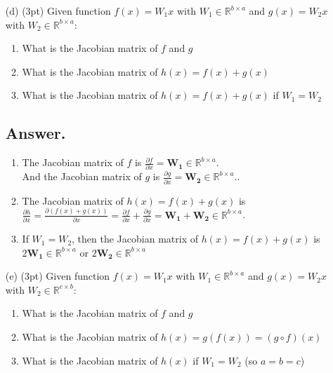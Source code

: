 \documentclass{article}
\begin{document}
\begin{itemize}
    \item[(d)] (3pt) Given function $f(x) = W_1 x$ with $W_1 \in \mathbb{R}^{b \times a}$ and $g(x) = W_2 x$ with $W_2 \in \mathbb{R}^{b \times a}$:
    \begin{enumerate}
        \item What is the Jacobian matrix of $f$ and $g$
        \item What is the Jacobian matrix of $h(x) = f(x) + g(x)$
        \item What is the Jacobian matrix of $h(x) = f(x) + g(x)$ if $W_1 = W_2$
    \end{enumerate}
    \subsection*{Answer.}
    \begin{enumerate}
        \item The Jacobian matrix of \(f\) is \(\frac{\partial f}{\partial x} = \boldsymbol{W_1} \in \mathbb{R}^{b \times a}\).\\
        And the Jacobian matrix of \(g\) is \(\frac{\partial g}{\partial x} = \boldsymbol{W_2} \in \mathbb{R}^{b \times a}\)..
        \item The Jacobian matrix of \(h(x) = f(x) + g(x)\) is \(\frac{\partial h}{\partial x} = \frac{\partial (f(x) + g(x))}{\partial x} = \frac{\partial f}{\partial x} + \frac{\partial g}{\partial x} = \boldsymbol{W_1} + \boldsymbol{W_2} \in \mathbb{R}^{b \times a}\).
        \item If \(W_1 = W_2\), then the Jacobian matrix of \(h(x) = f(x) + g(x)\) is \(2\boldsymbol{W_1} \in \mathbb{R}^{b \times a}\) or \(2\boldsymbol{W_2} \in \mathbb{R}^{b \times a}\)
    \end{enumerate}
    
    
    \item[(e)] (3pt) Given function $f(x) = W_1 x$ with $W_1 \in \mathbb{R}^{b \times a}$ and $g(x) = W_2 x$ with $W_2 \in \mathbb{R}^{c \times b}$:
    \begin{enumerate}
        \item What is the Jacobian matrix of $f$ and $g$
        \item What is the Jacobian matrix of $h(x) = g(f(x)) = (g \circ f)(x)$
        \item What is the Jacobian matrix of $h(x)$ if $W_1 = W_2$ (so $a = b = c$)
    \end{enumerate}

\end{itemize}
\end{document}
